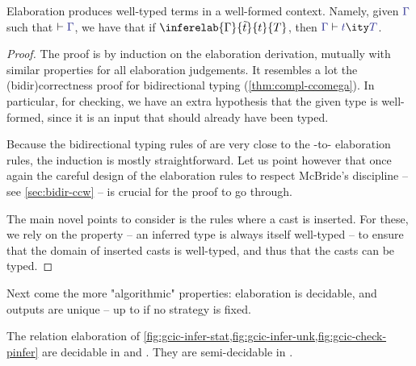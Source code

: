 \begin{theorem}
  \label{thm:correction}
	Elaboration produces well-typed terms in a well-formed context.
  Namely, given $\tcol{\Gamma}$ such that $\vdash \tcol{\Gamma}$, we have that
	if $\inferelab{\Gamma}{\tilde{t}}{t}{T}$, then $\inferty{\tcol{\Gamma}}{\tcol{t}}{\tcol{T}}$.

\end{theorem}

\begin{proof}
  The proof is by induction on the elaboration derivation,
  mutually with similar properties for all elaboration judgements.
  It resembles a lot the \kl(bidir){correctness} proof for bidirectional typing
  (\cref{thm:compl-ccomega}).
  In particular, for checking, we have an extra hypothesis that the
  given type is well-formed, since it is an input that should already
  have been typed.

  Because the bidirectional typing rules of  are very close to the
  -to- elaboration rules, the induction is mostly straightforward.
  Let us point however that once again the careful design of the elaboration rules to
  respect McBride’s discipline – see \cref{sec:bidir-ccw} – is crucial for the
  proof to go through.

  The main novel points to consider is the rules where a cast is inserted.
  For these, we rely on the  property –
  an inferred type is always itself well-typed –
  to ensure that the domain of inserted casts is well-typed,
  and thus that the casts can be typed.
\end{proof}

Next come the more "algorithmic" properties: elaboration is decidable,
and outputs are unique – up to  if no strategy is fixed.

\pagebreak

\begin{theorem}
	\label{thm:decidability}
	The relation elaboration of \cref{fig:gcic-infer-stat,fig:gcic-infer-unk,fig:gcic-check-pinfer}
  are decidable in  and . They are semi-decidable in .
\end{theorem}

